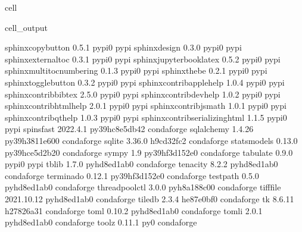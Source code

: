 \documentclass[letterpaper,table,10pt,english]{jupyterBook}
\begin{document}
\begin{sphinxuseclass}{cell}
\begin{sphinxVerbatimOutput}
\begin{sphinxuseclass}{cell_output}
\begin{sphinxVerbatim}[commandchars=\\\{\}]
sphinx\PYGZhy{}copybutton         0.5.1                    pypi\PYGZus{}0    pypi
sphinx\PYGZhy{}design             0.3.0                    pypi\PYGZus{}0    pypi
sphinx\PYGZhy{}external\PYGZhy{}toc       0.3.1                    pypi\PYGZus{}0    pypi
sphinx\PYGZhy{}jupyterbook\PYGZhy{}latex  0.5.2                    pypi\PYGZus{}0    pypi
sphinx\PYGZhy{}multitoc\PYGZhy{}numbering 0.1.3                    pypi\PYGZus{}0    pypi
sphinx\PYGZhy{}thebe              0.2.1                    pypi\PYGZus{}0    pypi
sphinx\PYGZhy{}togglebutton       0.3.2                    pypi\PYGZus{}0    pypi
sphinxcontrib\PYGZhy{}applehelp   1.0.4                    pypi\PYGZus{}0    pypi
sphinxcontrib\PYGZhy{}bibtex      2.5.0                    pypi\PYGZus{}0    pypi
sphinxcontrib\PYGZhy{}devhelp     1.0.2                    pypi\PYGZus{}0    pypi
sphinxcontrib\PYGZhy{}htmlhelp    2.0.1                    pypi\PYGZus{}0    pypi
sphinxcontrib\PYGZhy{}jsmath      1.0.1                    pypi\PYGZus{}0    pypi
sphinxcontrib\PYGZhy{}qthelp      1.0.3                    pypi\PYGZus{}0    pypi
sphinxcontrib\PYGZhy{}serializinghtml 1.1.5                    pypi\PYGZus{}0    pypi
spinsfast                 2022.4.1         py39hc8e5db4\PYGZus{}2    conda\PYGZhy{}forge
sqlalchemy                1.4.26           py39h3811e60\PYGZus{}0    conda\PYGZhy{}forge
sqlite                    3.36.0               h9cd32fc\PYGZus{}2    conda\PYGZhy{}forge
statsmodels               0.13.0           py39hce5d2b2\PYGZus{}0    conda\PYGZhy{}forge
sympy                     1.9              py39hf3d152e\PYGZus{}0    conda\PYGZhy{}forge
tabulate                  0.9.0                    pypi\PYGZus{}0    pypi
tblib                     1.7.0              pyhd8ed1ab\PYGZus{}0    conda\PYGZhy{}forge
tenacity                  8.2.2              pyhd8ed1ab\PYGZus{}0    conda\PYGZhy{}forge
terminado                 0.12.1           py39hf3d152e\PYGZus{}0    conda\PYGZhy{}forge
testpath                  0.5.0              pyhd8ed1ab\PYGZus{}0    conda\PYGZhy{}forge
threadpoolctl             3.0.0              pyh8a188c0\PYGZus{}0    conda\PYGZhy{}forge
tifffile                  2021.10.12         pyhd8ed1ab\PYGZus{}0    conda\PYGZhy{}forge
tiledb                    2.3.4                he87e0bf\PYGZus{}0    conda\PYGZhy{}forge
tk                        8.6.11               h27826a3\PYGZus{}1    conda\PYGZhy{}forge
toml                      0.10.2             pyhd8ed1ab\PYGZus{}0    conda\PYGZhy{}forge
tomli                     2.0.1              pyhd8ed1ab\PYGZus{}0    conda\PYGZhy{}forge
toolz                     0.11.1                     py\PYGZus{}0    conda\PYGZhy{}forge

\end{sphinxVerbatim}
\end{sphinxuseclass}
\end{sphinxVerbatimOutput}
\end{sphinxuseclass}
\end{document}
